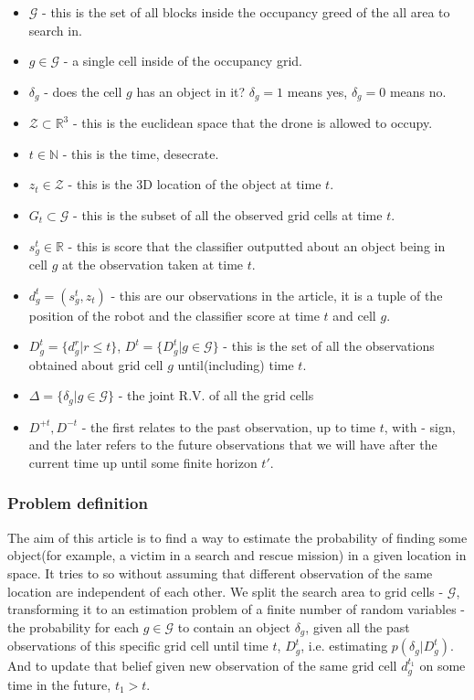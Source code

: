 \documentclass{article}
\begin{document}
	\begin{itemize}
		\item $\mathcal{G}$ - this is the set of all blocks inside the occupancy greed of the all area to
		search in.
		\item $g \in \mathcal{G}$ - a single cell inside of the occupancy grid.
		\item $\delta_g$ - does the cell $g$ has an object in it? $\delta_g = 1$ means yes, $\delta_g = 0$ means no. 
		\item $\mathcal{Z} \subset \mathbb{R}^3$ - this is the euclidean space that the drone is allowed to occupy. 
		\item $t \in \mathbb{N}$ - this is the time, desecrate.	
		\item $z_t \in \mathcal{Z}$ - this is the 3D location of the object at time $t$.
		\item $G_t \subset \mathcal{G}$ - this is the subset of all the observed grid cells at time $t$.
		\item $s_g^t \in \mathbb{R}$ - this is score that the classifier outputted about an object being in cell $g$ at the observation taken at time $t$.   
		\item $d^t_g = (s_g^t, z_t)$ - this are our observations in the article, it is a tuple of the position of the robot and the classifier score at time $t$ and cell $g$.
		\item $D_g^t = \{d_g^r|r \leq t\}$, $D^t=\{D_g^t|g\in\mathcal{G}\}$ - this is the set of all the observations obtained about grid cell $g$ until(including) time $t$. 
		\item $\Delta = \{\delta_g|g\in\mathcal{G}\}$ - the joint R.V. of all the grid cells
		\item $D^{+t},D^{-t}$ - the first relates to the past observation, up to time $t$, with - sign, and the later refers to the future observations that we will have after the current time up until some finite horizon $t'$. 
	\end{itemize}

	\subsubsection{Problem definition}
	The aim of this article is to find a way to estimate the probability of finding some object(for example, a victim in a search and rescue mission) in a given location in space. It tries to so without assuming that different observation of the same location are independent of each other. We split the search area to grid cells - $\mathcal{G}$, transforming it to an estimation problem of a finite number of random variables - the probability for each $g \in \mathcal{G}$ to contain an object $\delta_g$, given all the past observations of this specific grid cell until time $t$, $D_g^t$, i.e. estimating $p(\delta_g|D_g^t)$. And to update that belief given new observation of the same grid cell $d_g^{t_1}$ on some time in the future, $t_1>t$. \\
	
\end{document}
